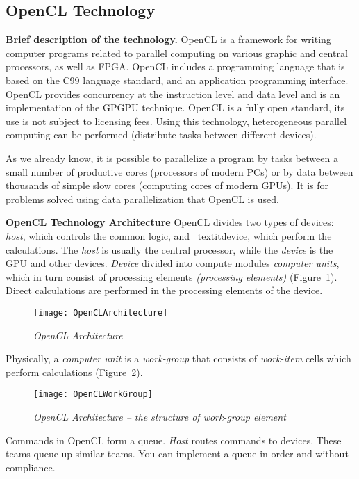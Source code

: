 { %
	\subsection{OpenCL Technology}
	\label{OpenCL:section}
	\par\textbf{Brief description of the technology.} OpenCL is a framework for writing computer programs related to parallel computing on various graphic and central processors, as well as FPGA. OpenCL includes a programming language that is based on the C99 language standard, and an application programming interface. OpenCL provides concurrency at the instruction level and data level and is an implementation of the GPGPU technique. OpenCL is a fully open standard, its use is not subject to licensing fees. Using this technology, heterogeneous parallel computing can be performed (distribute tasks between different devices).
	\par As we already know, it is possible to parallelize a program by tasks between a small number of productive cores (processors of modern PCs) or by data between thousands of simple slow cores (computing cores of modern GPUs). It is for problems solved using data parallelization that OpenCL is used.
	\par\textbf{OpenCL Technology Architecture} OpenCL divides two types of devices: \textit{host}, which controls the common logic, and \ textit{device}, which perform the calculations. The \textit{host} is usually the central processor, while the \textit{device} is the GPU and other devices. \textit{Device} divided into compute modules \textit{computer units}, which in turn consist of processing elements \textit{(processing elements)} (Figure~\ref{OpenCLArchitecture:image}). Direct calculations are performed in the processing elements of the device.
	\begin{figure}[H]
		\texttt{[image: OpenCLArchitecture]}
		\caption{\textit{OpenCL Architecture}}
		\label{OpenCLArchitecture:image}
	\end{figure}
	\par Physically, a \textit{computer unit} is a \textit{work-group} that consists of \textit{work-item} cells which perform calculations (Figure~\ref{OpenCLWorkGroup:image}).
	\begin{figure}[H]
		\texttt{[image: OpenCLWorkGroup]}
		\caption{\textit{OpenCL  Architecture – the structure of work-group element}}
		\label{OpenCLWorkGroup:image}
	\end{figure}
	\par Commands in OpenCL form a queue. \textit {Host} routes commands to devices. These teams queue up similar teams. You can implement a queue in order and without compliance.
}

